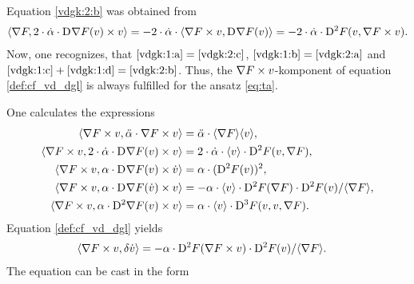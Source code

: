 Equation \eqref{vdgk:2:b} was obtained from
\begin{align*}
    \langle  \nabla F ,  2 \cdot \dot{ \alpha } \cdot \mathrm{D}^{  }\nabla F( v ) \times v  \rangle   =
    - 2 \cdot \dot{ \alpha } \cdot
    \langle  \nabla F \times v ,  \mathrm{D}^{  } \nabla F( v )   \rangle   =
    - 2 \cdot \dot{ \alpha } \cdot \mathrm{D}^{ 2 }F( v, \nabla F \times v ) .
\end{align*}
Now, one recognizes, that $ \eqref{vdgk:1:a}  =  \eqref{vdgk:2:c} $,
$ \eqref{vdgk:1:b}  =  \eqref{vdgk:2:a} $ and
$ \eqref{vdgk:1:c} + \eqref{vdgk:1:d}  =  \eqref{vdgk:2:b} $.
Thus, the $ \nabla F \times v $-komponent of equation \eqref{def:cf_vd_dgl}
is always fulfilled for the ansatz \eqref{eq:ta}.



One calculates the expressions
\begin{subequations}
    \begin{align}
        \langle  \nabla F  \times v ,  \ddot{ \alpha } \cdot \nabla F  \times v  \rangle
        &=
        \ddot{ \alpha } \cdot \langle  \nabla F   \rangle \langle  v  \rangle ,
        \\
        \langle  \nabla F  \times v ,  2 \cdot \dot{ \alpha } \cdot \mathrm{D}^{  } \nabla F  ( v ) \times v  \rangle
        &=
        2 \cdot \dot{ \alpha } \cdot \langle  v  \rangle \cdot \mathrm{D}^{ 2 } F ( v, \nabla F  ) ,
        \\
        \langle  \nabla F  \times v ,  \alpha \cdot \mathrm{D}^{  } \nabla F  ( v ) \times \dot{ v }  \rangle
        &=
        \alpha \cdot  ( \mathrm{D}^{ 2 } F ( v ) )^2 ,
        \\
        \langle  \nabla F  \times v ,  \alpha \cdot \mathrm{D}^{  } \nabla F  ( \dot{ v } ) \times v  \rangle
        &=
        - \alpha \cdot \langle  v  \rangle \cdot \mathrm{D}^{ 2 } F ( \nabla F  ) \cdot
        \mathrm{D}^{ 2 } F ( v ) / \langle  \nabla F   \rangle ,
        \\
        \langle  \nabla F  \times v ,  \alpha \cdot \mathrm{D}^{ 2 } \nabla F  ( v ) \times v  \rangle
        &=
        \alpha \cdot \langle  v  \rangle \cdot \mathrm{D}^{ 3 } F ( v, v, \nabla F  ) .
    \end{align}
\end{subequations}
Equation \eqref{def:cf_vd_dgl} yields
\begin{align}
    \langle  \nabla F  \times v ,  \delta \dot{ v }  \rangle
    &=
    -\alpha \cdot \mathrm{D}^{ 2 } F ( \nabla F  \times v ) \cdot
    \mathrm{D}^{ 2 } F ( v ) / \langle  \nabla F   \rangle .
\end{align}
The equation can be cast in the form
